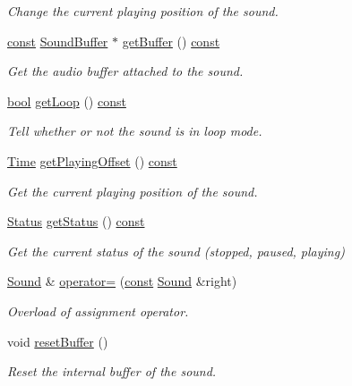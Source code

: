 \begin{DoxyCompactItemize}
\begin{DoxyCompactList}\small\item\em Change the current playing position of the sound. \end{DoxyCompactList}\item 
\hyperlink{term__entry_8h_a57bd63ce7f9a353488880e3de6692d5a}{const} \hyperlink{classsf_1_1_sound_buffer}{Sound\-Buffer} $\ast$ \hyperlink{classsf_1_1_sound_a5f2f1ec6603f73625f393f0e9ab64476}{get\-Buffer} () \hyperlink{term__entry_8h_a57bd63ce7f9a353488880e3de6692d5a}{const} 
\begin{DoxyCompactList}\small\item\em Get the audio buffer attached to the sound. \end{DoxyCompactList}\item 
\hyperlink{term__entry_8h_a002004ba5d663f149f6c38064926abac}{bool} \hyperlink{classsf_1_1_sound_a603fbd32b519ae1680c40d8ddfc7ea51}{get\-Loop} () \hyperlink{term__entry_8h_a57bd63ce7f9a353488880e3de6692d5a}{const} 
\begin{DoxyCompactList}\small\item\em Tell whether or not the sound is in loop mode. \end{DoxyCompactList}\item 
\hyperlink{classsf_1_1_time}{Time} \hyperlink{classsf_1_1_sound_aeca741a3442d9934369a986ad40f19c0}{get\-Playing\-Offset} () \hyperlink{term__entry_8h_a57bd63ce7f9a353488880e3de6692d5a}{const} 
\begin{DoxyCompactList}\small\item\em Get the current playing position of the sound. \end{DoxyCompactList}\item 
\hyperlink{classsf_1_1_sound_source_ac43af72c98c077500b239bc75b812f03}{Status} \hyperlink{classsf_1_1_sound_ae8b4084ff8f460b7a2bf9d39e846dab9}{get\-Status} () \hyperlink{term__entry_8h_a57bd63ce7f9a353488880e3de6692d5a}{const} 
\begin{DoxyCompactList}\small\item\em Get the current status of the sound (stopped, paused, playing) \end{DoxyCompactList}\item 
\hyperlink{classsf_1_1_sound}{Sound} \& \hyperlink{classsf_1_1_sound_a08c64c9c1dabeebc59fbf2540d81d4dd}{operator=} (\hyperlink{term__entry_8h_a57bd63ce7f9a353488880e3de6692d5a}{const} \hyperlink{classsf_1_1_sound}{Sound} \&right)
\begin{DoxyCompactList}\small\item\em Overload of assignment operator. \end{DoxyCompactList}\item 
void \hyperlink{classsf_1_1_sound_acb7289d45e06fb76b8292ac84beb82a7}{reset\-Buffer} ()
\begin{DoxyCompactList}\small\item\em Reset the internal buffer of the sound. \end{DoxyCompactList}\end{DoxyCompactItemize}
